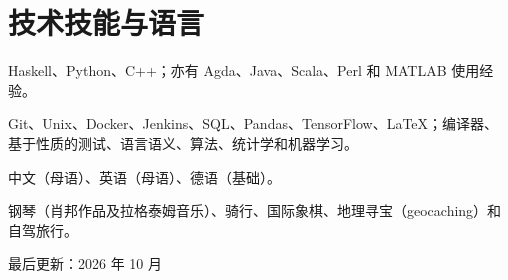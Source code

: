 \documentclass[11pt]{article}
\begin{document}
\section{技术技能与语言}

\begin{description}[style=multiline,leftmargin=6.5em]
  \item[编程语言] Haskell、Python、C++；亦有 Agda、Java、Scala、Perl 和 MATLAB 使用经验。
  \item[工具与方法] Git、Unix、Docker、Jenkins、SQL、Pandas、TensorFlow、\LaTeX；编译器、基于性质的测试、语言语义、算法、统计学和机器学习。
  \item[自然语言] 中文（母语）、英语（母语）、德语（基础）。
  \item[兴趣爱好] 钢琴（肖邦作品及拉格泰姆音乐）、骑行、国际象棋、地理寻宝（geocaching）和自驾旅行。
\end{description}

\vspace{6pt}
\begin{center}
  {\small\color{gray}最后更新：2026 年 10 月}
\end{center}
\end{document}
